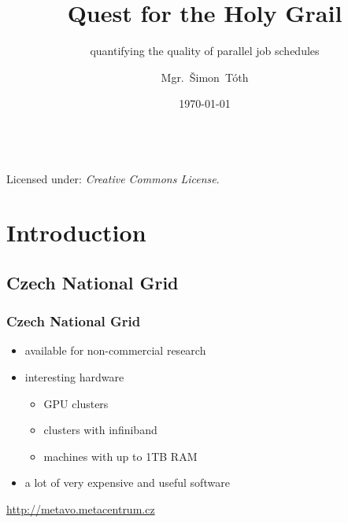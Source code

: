 

\title{Quest for the Holy Grail}
\subtitle{quantifying the quality of parallel job schedules}
\author[]{Mgr.~Šimon~Tóth}
\date{\today}

\newcommand{\CcNote}[1]{%
	Licensed under: \textit{Creative Commons #1 3.0 License}.%
}



\begin{frame}
	\titlepage
	\vfill
	\begin{center}
		\\ {\tiny\CcNote{\CcLongnameByNcSa}}
		\vspace*{2ex}
	\end{center}
\end{frame}



\section{Introduction}
\subsection{Czech National Grid}

\begin{frame}
	\frametitle{Czech National Grid}
	\begin{itemize}
		\item available for non-commercial research \pause
		\item interesting hardware \pause
		\begin{itemize}
			\item GPU clusters
			\item clusters with infiniband
			\item machines with up to 1TB RAM
		\end{itemize} \pause
		\item a lot of very expensive and useful software
	\end{itemize}
	\url{http://metavo.metacentrum.cz}
\end{frame}

